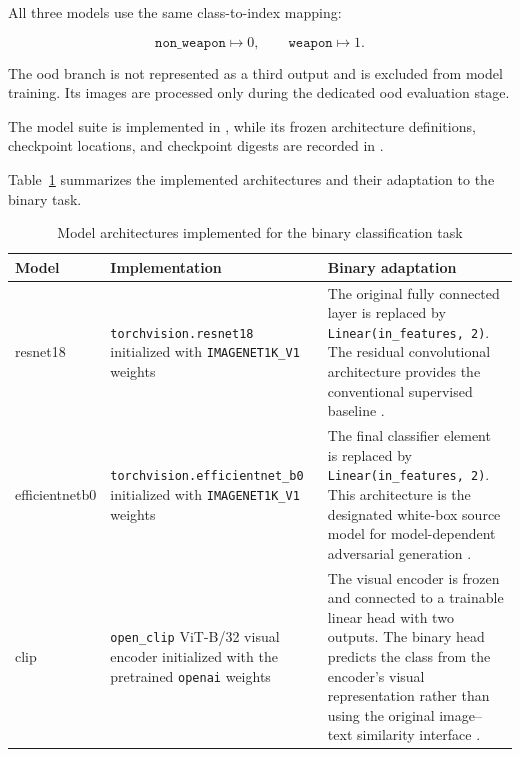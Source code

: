 All three models use the same class-to-index mapping:

\[
\texttt{non\_weapon} \mapsto 0,
\qquad
\texttt{weapon} \mapsto 1.
\]

The \gls{ood} branch is not represented as a third output and is excluded from
model training. Its images are processed only during the dedicated
\gls{ood} evaluation stage.

The model suite is implemented in
, while its frozen
architecture definitions, checkpoint locations, and checkpoint digests are
recorded in .

Table~\ref{tab:implementation-proxy-architectures} summarizes the implemented
architectures and their adaptation to the binary task.

\begin{table}[H]
\centering
\scriptsize
\renewcommand{\arraystretch}{1.15}
\setlength{\tabcolsep}{4pt}
\caption{Model architectures implemented for the binary classification task}
\label{tab:implementation-proxy-architectures}
\begin{tabularx}{\textwidth}{@{}p{} p{} X@{}}
\toprule
\textbf{Model} &
\textbf{Implementation} &
\textbf{Binary adaptation} \\
\midrule

\gls{resnet18}
&
\texttt{torchvision.resnet18} initialized with
\texttt{IMAGENET1K\_V1} weights
&
The original fully connected layer is replaced by
\texttt{Linear(in\_features, 2)}. The residual convolutional architecture
provides the conventional supervised baseline \cite{he2016deep}. \\

\gls{efficientnetb0}
&
\texttt{torchvision.efficientnet\_b0} initialized with
\texttt{IMAGENET1K\_V1} weights
&
The final classifier element is replaced by
\texttt{Linear(in\_features, 2)}. This architecture is the designated
white-box source model for model-dependent adversarial generation
\cite{tan2019efficientnet}. \\

\gls{clip}
&
\texttt{open\_clip} ViT-B/32 visual encoder initialized with the pretrained
\texttt{openai} weights
&
The visual encoder is frozen and connected to a trainable linear head with two
outputs. The binary head predicts the class from the encoder's visual
representation rather than using the original image--text similarity interface
\cite{radford2021learning}. \\

\bottomrule
\end{tabularx}
\end{table}

